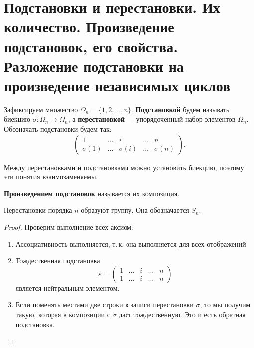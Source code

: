 \section{Подстановки и перестановки. Их количество. Произведение подстановок, его свойства. Разложение подстановки на произведение независимых циклов}

\begin{definition}
    Зафиксируем множество $\Omega_n = \{1, 2, \ldots, n\}$. \textbf{Подстановкой} будем называть биекцию $\sigma : \Omega_n \rightarrow \Omega_n$, а \textbf{перестановкой} --- упорядоченный набор элементов $\Omega_n$. Обозначать подстановки будем так:
    $$
    \begin{pmatrix}
        1 & \ldots & i & \ldots & n\\
        \sigma(1) & \ldots & \sigma(i) & \ldots & \sigma(n)
    \end{pmatrix}.
    $$
\end{definition}

\begin{remark}
    Между перестановками и подстановками можно установить биекцию, поэтому эти понятия взаимозаменяемы.
\end{remark}

\begin{definition}
    \textbf{Произведением подстановок} называется их композиция.
\end{definition}

\begin{theorem}
    Перестановки порядка $n$ образуют группу. Она обозначается $S_n$.
\end{theorem}

\begin{proof}
    Проверим выполнение всех аксиом:
    \begin{enumerate}
        \item Ассоциативность выполняется, т.\,к. она выполняется для всех отображений
        \item Тождественная подстановка
            $$
            \varepsilon = 
            \begin{pmatrix}
                1 & \ldots & i & \ldots & n\\
                1 & \ldots & i & \ldots & n
            \end{pmatrix}
            $$
            является нейтральным элементом.
        \item Если поменять местами две строки в записи перестановки $\sigma$, то мы получим такую, которая в композиции с $\sigma$ даст тождественную. Это и есть обратная подстановка.
    \end{enumerate}
\end{proof}

